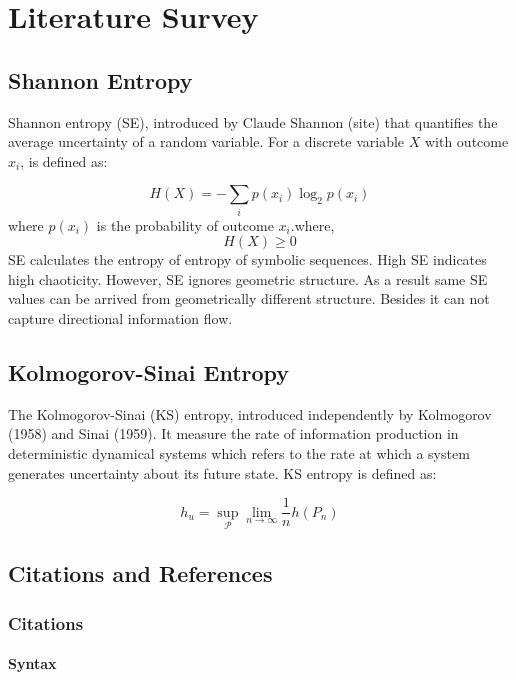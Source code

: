 \documentclass[%
 reprint,
 amsmath,amssymb,
 aps,
 floatfix,
]{revtex4-2}
\begin{document}
\section{Literature Survey}
\subsection{Shannon Entropy}
Shannon entropy (SE), introduced by Claude Shannon (site) that quantifies the average uncertainty of a random variable. For a discrete variable $X$ with outcome ${x_i}$, is defined as:

\begin{equation}
H(X) = -\sum_{i} p(x_i) \log_2 p(x_i)
\label{eq:shannon}
\end{equation}
where $p(x_i)$ is the probability of outcome $x_i$.where,
\[
H(X) \geq 0
\]
SE calculates the entropy of entropy of symbolic sequences. High SE indicates high chaoticity. However, SE ignores geometric structure. As a result same SE values can be arrived from geometrically different  structure. Besides it can not capture directional information flow.\\
\subsection{Kolmogorov-Sinai Entropy}
The Kolmogorov-Sinai (KS) entropy, introduced independently by Kolmogorov (1958) and Sinai (1959). It measure the rate of information production in deterministic dynamical systems which refers to the rate at which a system generates uncertainty about its future state. KS entropy is defined as:

\begin{equation}
	h_u  = \operatorname*{sup}_{\mathcal{P}} \operatorname*{\lim}_{n \to \infty} \frac{1}{n} h(P_n)	
\end{equation}

\subsection{\label{sec:citeref}Citations and References}


\subsubsection{Citations}


\paragraph{Syntax}
\end{document}
